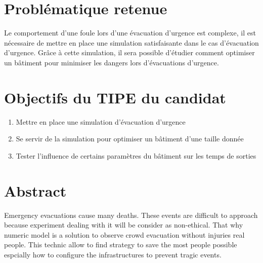 \documentclass[12pt]{article}
\begin{document}
\section*{Problématique retenue}
Le comportement d'une foule lors d'une évacuation d'urgence est complexe, il est nécessaire de mettre en place une simulation satisfaisante dans le cas d'évacuation d'urgence.
\newline\newline
Grâce à cette simulation, il sera possible d'étudier comment optimiser un bâtiment pour minimiser les dangers lors d'évacuations d'urgence.

\section*{Objectifs du TIPE du candidat}
\begin{enumerate}
    \item Mettre en place une simulation d'évacuation d'urgence
    \item Se servir de la simulation pour optimiser un bâtiment d'une taille donnée
    \item Tester l'influence de certains paramètres du bâtiment sur les temps de sorties
\end{enumerate}

\section*{Abstract}
Emergency evacuations cause many deaths. These events are difficult to approach because experiment dealing with it
will be consider as non-ethical. That why numeric model is a solution to observe crowd evacuation without injuries real people.
This technic allow to find strategy to save the most people possible espcially how to configure the infrastructures to prevent tragic events.
\end{document}
